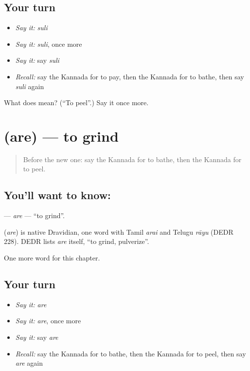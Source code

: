 \subsection*{Your turn}
\begin{itemize}
\raggedright
  \item \emph{Say it:} \emph{suli}
  \item \emph{Say it:} \emph{suli}, once more
  \item \emph{Say it:} say \emph{suli}
  \item \emph{Recall:} say the Kannada for to pay, then the Kannada for to bathe, then say \emph{suli} again
\end{itemize}

\begin{tcolorbox}[breakable,colback=teal!4,colframe=teal!35!black,title={Before you move on}]
What does  mean? (\textquotedblleft{}To peel\textquotedblright{}.) Say it once more.
\end{tcolorbox}
\section[\texorpdfstring{\kn{ಅರೆ} (are)}{ಅರೆ (are)}]{ (are) — to grind}

\label{lesson:KA-C159-are}



\begin{quote}
Before the new one: say the Kannada for to bathe, then the Kannada for to peel.
\end{quote}

\subsection*{You'll want to know: }
\textbf{} — \emph{are} — \textquotedblleft{}to grind\textquotedblright{}.

\begin{cousinweb}
\textbf{} (\emph{are}) is native Dravidian, one word with Tamil \emph{arai} and Telugu \emph{rāyu} (DEDR 228). DEDR lists \emph{are} itself, \textquotedblleft{}to grind, pulverize\textquotedblright{}.
\end{cousinweb}

\begin{grammarlens}[title={What you've built}]
One more word for this chapter.
\end{grammarlens}

\subsection*{Your turn}
\begin{itemize}
\raggedright
  \item \emph{Say it:} \emph{are}
  \item \emph{Say it:} \emph{are}, once more
  \item \emph{Say it:} say \emph{are}
  \item \emph{Recall:} say the Kannada for to bathe, then the Kannada for to peel, then say \emph{are} again
\end{itemize}

